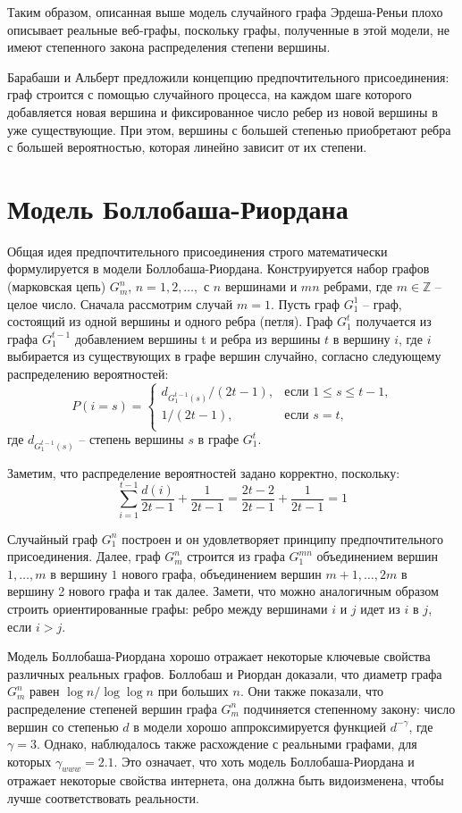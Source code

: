 \documentclass[14pt]{extreport}
\begin{document}
Таким образом, описанная выше модель случайного графа Эрдеша-Реньи плохо описывает реальные веб-графы, поскольку графы, полученные в этой модели, не имеют степенного закона распределения степени вершины. 

Барабаши и Альберт предложили концепцию предпочтительного присоединения: граф строится с помощью случайного процесса, на каждом шаге которого добавляется новая вершина и фиксированное число ребер из новой вершины в уже существующие. При этом, вершины с большей степенью приобретают ребра с большей вероятностью, которая линейно зависит от их степени.

\section{Модель Боллобаша-Риордана}
Общая идея предпочтительного присоединения строго математически формулируется в модели Боллобаша-Риордана. Конструируется набор графов (марковская цепь) $G_m^n$, $n=1, 2, \dots,$ с $n$ вершинами и $mn$ ребрами, где $m \in \mathbb{Z}$ -- целое число. Сначала рассмотрим случай $m = 1$. Пусть граф $G_1^1$ -- граф, состоящий из одной вершины и одного ребра (петля). Граф $G_1^t$ получается из графа $G_1^{t-1}$ добавлением вершины t и ребра из вершины $t$ в вершину $i$, где $i$ выбирается из существующих в графе вершин случайно, согласно следующему распределению вероятностей:
$$  
P(i=s) =
\begin{cases}  
  d_{G_1^{t-1}(s)}/(2t-1),&\text{если $1 \le s \le t-1$,}\\
  1/(2t-1),&\text{если $s=t$,}\\
\end{cases}
$$  
где $d_{G_1^{t-1}(s)}$ -- степень вершины $s$ в графе $G_1^t$. 

Заметим, что распределение вероятностей задано корректно, поскольку:
$$
\sum_{i=1}^{t-1}\frac{d(i)}{2t-1} + \frac{1}{2t-1}=\frac{2t-2}{2t-1}+\frac{1}{2t-1}=1
$$

Случайный граф $G_1^n$ построен и он удовлетворяет принципу предпочтительного присоединения. Далее, граф $G_m^n$ строится из графа $G_1^{mn}$ объединением вершин $1, \dots, m$ в вершину $1$ нового графа, объединением вершин $m+1, \dots, 2m$ в вершину 2 нового графа и так далее. Замети, что можно аналогичным образом строить ориентированные графы: ребро между вершинами $i$ и $j$ идет из $i$ в $j$, если $i > j$.

Модель Боллобаша-Риордана хорошо отражает некоторые ключевые свойства различных реальных графов. Боллобаш и Риордан доказали, что диаметр графа $G_m^n$ равен $\log n / \log \log n$ при больших $n$. Они также показали, что распределение степеней вершин графа $G_m^n$ подчиняется степенному закону: число вершин со степенью $d$ в модели хорошо аппроксимируется функцией $d^{-\gamma}$, где $\gamma  = 3$. Однако, наблюдалось также расхождение с реальными графами, для которых $\gamma_{www}=2.1$. Это означает, что хоть модель Боллобаша-Риордана и отражает некоторые свойства интернета, она должна быть видоизменена, чтобы лучше соответствовать реальности.
\end{document}
